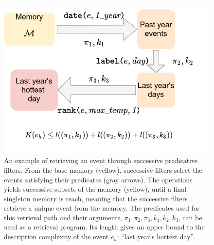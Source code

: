\documentclass[conference]{IEEEtran}
\begin{document}

\begin{figure}[ht]
  \centering
  \includegraphics[width=\linewidth]{figures/filters}
  \caption{An example of retrieving an event through successive predicative
    filters. From the base memory (yellow), successive filters select the events
    satisfying their predicates (gray arrows). The operations yields successive
    subsets of the memory (yellow), until a final singleton memory is reach,
    meaning that the successive filters retrieve a unique event from the memory.
    The predicates used for this retrieval path and their arguments,
    $\pi_{1}, \pi_{2}, \pi_{3}, k_{1}, k_{2}, k_{3}$, can be used as a retrieval
    program. Its length gives an upper bound to the description complexity of
    the event $e_{h}$: ``last year's hottest day''.}
  \label{fig:filters}
\end{figure}
\end{document}
